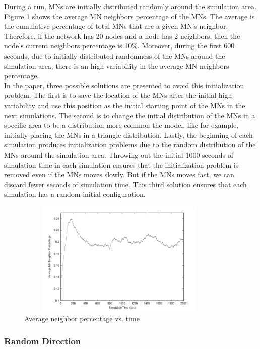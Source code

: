 During a run, MNs are initially distributed randomly around the simulation area. Figure \ref{RandomWaypointFig2} shows the average MN neighbors percentage of the MNs. The average is the cumulative percentage of total MNs that are a given MN's neighbor. Therefore, if the network has 20 nodes and a node has 2 neighbors, then the node's current neighbors percentage is 10\%. Moreover, during the first 600 seconds, due to initially distributed randomness of the MNs around the simulation area, there is an high variability in the average MN neighbors percentage.\\
In the paper, three possible solutions are presented to avoid this initialization problem. The first is to save the location of the MNs after the initial high variability and use this position as the initial starting point of the MNs in the next simulations. The second is to change the initial distribution of the MNs in a specific area to be a distribution more common the model, like for example, initially placing the MNs in a triangle distribution. Lastly, the beginning of each simulation produces initialization problems due to the random distribution of the MNs around the simulation area. Throwing out the initial 1000 seconds of simulation time in each simulation ensures that the initialization problem is removed even if the MNs moves slowly. But if the MNs moves fast, we can discard fewer seconds of simulation time. This third solution ensures that each simulation has a random initial configuration.\\

\begin{figure}[h]
\center
\includegraphics[width=10cm,height=55mm]{../images/randomwaypoint2.png}
\caption{\label{RandomWaypointFig2}Average neighbor percentage vs. time}
\end{figure}

\newpage

\subsubsection{Random Direction}

